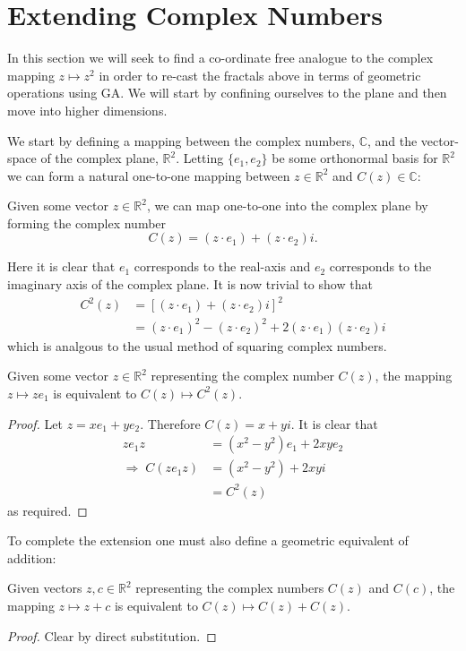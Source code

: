 \section{Extending Complex Numbers}

In this section we will seek to find a co-ordinate free analogue to the
complex mapping $z \mapsto z^2$ in order to re-cast the fractals above in
terms of geometric operations using GA. We will start by confining ourselves
to the plane and then move into higher dimensions.

We start by defining a mapping between the complex numbers, $\mathbb{C}$, and
the vector-space of the complex plane, $\mathbb{R}^2$. Letting $\{e_1, e_2\}$
be some orthonormal basis for $\mathbb{R}^2$ we can form a natural one-to-one
mapping between $z \in \mathbb{R}^2$ and $C(z) \in \mathbb{C}$:

\begin{definition}
Given some vector $z \in \mathbb{R}^2$, we can map one-to-one into the
complex plane by forming the complex number
\[
C(z) = (z \cdot e_1) + (z \cdot e_2)i.
\]
\end{definition}

Here it is clear that $e_1$ corresponds to the real-axis and $e_2$ 
corresponds to the imaginary axis of the complex plane.
It is now trivial to show that
\begin{align*}
C^2(z) &= [(z \cdot e_1) + (z \cdot e_2)i]^2 \\
       &= (z \cdot e_1)^2 - (z \cdot e_2)^2 + 2(z \cdot e_1)(z \cdot e_2)i
\end{align*}
which is analgous to the usual method of squaring complex numbers.

\begin{lemma}
Given some vector $z \in \mathbb{R}^2$ representing the complex number
$C(z)$, the mapping $z \mapsto ze_1$ is equivalent to $C(z) \mapsto C^2(z)$.
\end{lemma}
\begin{proof}
Let $z = xe_1 + ye_2$. Therefore $C(z) = x + yi$. It is clear that
\begin{align*}
ze_1z &= (x^2 - y^2) e_1 + 2xye_2 \\
\Rightarrow\;C(ze_1z) &= (x^2 - y^2) + 2xyi\\
        &= C^2(z)
\end{align*}
as required.
\end{proof}

To complete the extension one must also define a geometric equivalent of
addition:
\begin{lemma}
Given vectors $z, c \in \mathbb{R}^2$ representing the complex numbers
$C(z)$ and $C(c)$, the mapping $z \mapsto z + c$ is equivalent to 
$C(z) \mapsto C(z) + C(z)$.
\end{lemma}
\begin{proof}
Clear by direct substitution.
\end{proof}

